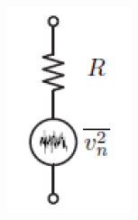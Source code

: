 \begin{minipage}[c]{0.15\columnwidth}
    \includegraphics[width=\columnwidth]{images/rauschquelle_spannung.png}
\end{minipage}

